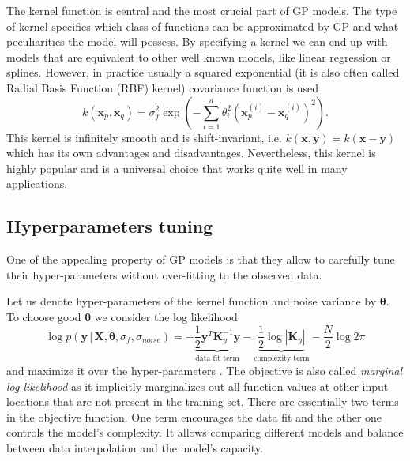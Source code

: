 The kernel function is central and the most crucial part of GP models.
The type of kernel specifies which class of functions can be approximated by GP
and what peculiarities the model will possess.
By specifying a kernel we can end up with models that are equivalent to other
well known models, like linear regression or splines.
However, in practice usually a squared exponential (it is also often called Radial Basis Function (RBF) kernel) covariance function is used
\begin{equation}
  \label{eq:covariance_function}
  k(\mathbf{x}_p, \mathbf{x}_q) = \sigma_f^2 \exp \left ( -\sum_{i = 1}^d \theta_i^2 (\mathbf{x}_p^{(i)} - \mathbf{x}_q^{(i)})^2 \right ).
\end{equation}
This kernel is infinitely smooth and is shift-invariant,
i.e. $k(\mathbf{x, y}) = k(\mathbf{x - y})$ which has its own advantages and disadvantages.
Nevertheless, this kernel is highly popular and is a universal choice
that works quite well in many applications.


\subsection{Hyperparameters tuning}
One of the appealing property of GP models is that they allow to
carefully tune their hyper-parameters without over-fitting to the observed data.

Let us denote hyper-parameters of the kernel function and noise variance by $\bm{\theta}$.
To choose good $\bm{\theta}$ we consider the log likelihood
\begin{equation}
  \label{eq:loglikelihood}
    \log p(\mathbf{y} \, | \, \mathbf{X}, \boldsymbol{\theta}, \sigma_f, \sigma_{noise}) =
    -\underbrace{\frac12 \mathbf{y}^T \mathbf{K}_y^{-1}\mathbf{y}}_{\text{data fit term}}
    - \underbrace{\frac12 \log |\mathbf{K}_y|}_{\text{complexity term}}
    - \frac{N}{2} \log 2 \pi
\end{equation}
and maximize it over the hyper-parameters \citep{rasmussen2006gaussian}.
The objective is also called {\em marginal log-likelihood} as it implicitly
marginalizes out all function values at other input locations that are not present
in the training set.
There are essentially two terms in the objective function.
One term encourages the data fit and the other one controls the model's complexity.
It allows comparing different models and balance between data interpolation and
the model's capacity.

